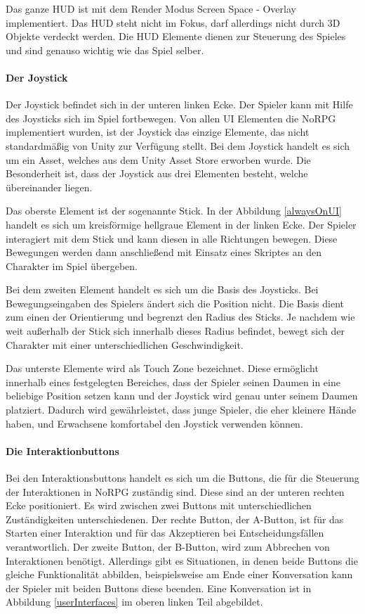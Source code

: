 				Das ganze \ac{HUD} ist mit dem Render Modus Screen Space - Overlay implementiert. Das \ac{HUD} steht nicht im Fokus, darf allerdings nicht durch 3D Objekte verdeckt werden. Die \ac{HUD} Elemente dienen zur Steuerung des Spieles und sind genauso wichtig wie das Spiel selber.

				\paragraph{Der Joystick}
					Der Joystick befindet sich in der unteren linken Ecke. Der Spieler kann mit Hilfe des Joysticks sich im Spiel fortbewegen. Von allen \ac{UI} Elementen die NoRPG implementiert wurden, ist der Joystick das einzige Elemente, das nicht standardmäßig von Unity zur Verfügung stellt. Bei dem Joystick handelt es sich um ein Asset, welches aus dem Unity Asset Store erworben wurde. Die Besonderheit ist, dass der Joystick aus drei Elementen besteht, welche übereinander liegen. 

					Das oberste Element ist der sogenannte Stick. In der Abbildung \ref{alwaysOnUI} handelt es sich um kreisförmige hellgraue Element in der linken Ecke. Der Spieler interagiert mit dem Stick und kann diesen in alle Richtungen bewegen. Diese Bewegungen werden dann anschließend mit Einsatz eines Skriptes an den Charakter im Spiel übergeben. 

					Bei dem zweiten Element handelt es sich um die Basis des Joysticks. Bei Bewegungseingaben des Spielers ändert sich die Position nicht. Die Basis dient zum einen der Orientierung und begrenzt den Radius des Sticks. Je nachdem wie weit außerhalb der Stick sich innerhalb dieses Radius befindet, bewegt sich der Charakter mit einer unterschiedlichen Geschwindigkeit.

					Das unterste Elemente wird als Touch Zone bezeichnet. Diese ermöglicht innerhalb eines festgelegten Bereiches, dass der Spieler seinen Daumen in eine beliebige Position setzen kann und der Joystick wird genau unter seinem Daumen platziert. Dadurch wird gewährleistet, dass junge Spieler, die eher kleinere Hände haben, und Erwachsene komfortabel den Joystick verwenden können.

				\paragraph{Die Interaktionbuttons}
					Bei den Interaktionsbuttons handelt es sich um die Buttons, die für die Steuerung der Interaktionen in NoRPG zuständig sind. Diese sind an der unteren rechten Ecke positioniert. Es wird zwischen zwei Buttons mit unterschiedlichen Zuständigkeiten unterschiedenen. Der rechte Button, der A-Button, ist für das Starten einer Interaktion und für das Akzeptieren bei Entscheidungsfällen verantwortlich. Der zweite Button, der B-Button, wird zum Abbrechen von Interaktionen benötigt. Allerdings gibt es Situationen, in denen beide Buttons die gleiche Funktionalität abbilden, beispielsweise am Ende einer Konversation kann der Spieler mit beiden Buttons diese beenden. Eine Konversation ist in Abbildung \ref{userInterfaces} im oberen linken Teil abgebildet.

